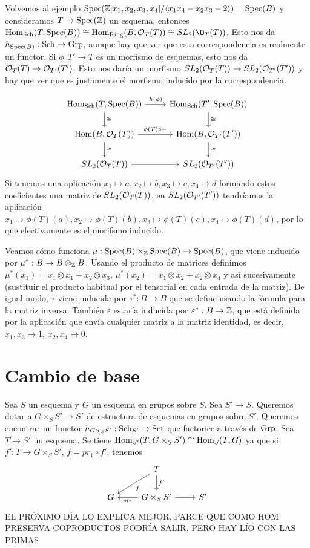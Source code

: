 \documentclass[GA.tex]{subfiles}
\begin{document}
\begin{ej}
Volvemos al ejemplo $\operatorname{Spec}(\mathbb{Z}[x_1,x_2,x_3,x_4]/\langle{x_1x_4-x_2x_3-2}\rangle)=\operatorname{Spec}(B)$ y consideramos $T\to\operatorname{Spec}(\mathbb{Z})$ un esquema, entonces $\Hom_{\Sch}(T, \spec(B))\cong \Hom_{\Ring}(B,\OO_T(T))\cong SL_2(\O_T(T))$. Esto nos da $h_{\operatorname{Spec}(B)}:\operatorname{Sch}\to\operatorname{Grp}$, aunque hay que ver que esta correspondencia es realmente un functor. Si $\phi:T'\to T$ es un morfismo de esquemas, esto nos da ${\mathcal O}_T(T)\to{\mathcal O}_{T'}(T')$. Esto nos daría un morfismo $SL_2({\mathcal O}_T(T))\to SL_2({\mathcal O}_{T'}(T'))$ y hay que ver que es justamente el morfismo inducido por la correspondencia.

\[
\begin{tikzcd}
\Hom_{\Sch}(T,\spec(B))\arrow[r, "h(\phi)"]\arrow[d, "\cong"] & \Hom_{\Sch}(T',\spec(B))\arrow[d, "\cong"]\\
\Hom(B,\OO_T(T))\arrow[r, "\phi(T)\circ-"]\arrow[d, "\cong"] & \Hom(B,\OO_{T'}(T'))\arrow[d,"\cong"]\\
SL_2(\OO_T(T))\arrow[r] & SL_2(\OO_{T'}(T'))
\end{tikzcd}
\]
Si tenemos una aplicación $x_1\mapsto a, x_2\mapsto b, x_3\mapsto c, x_4\mapsto d$ formando estos coeficientes una matriz de $SL_2({\mathcal O}_T(T))$, en $SL_2({\mathcal O}_{T'}(T'))$ tendríamos la aplicación $x_1\mapsto \phi(T)(a), x_2\mapsto\phi(T)(b),x_3\mapsto\phi(T)(c),x_4\mapsto\phi(T)(d)$, por lo que efectivamente es el morifsmo inducido. 


Veamos cómo funciona $\mu:\operatorname{Spec}(B)\times_{\mathbb{Z}}\operatorname{Spec}(B)\to\operatorname{Spec}(B)$, que viene inducido por $\mu^*:B\to B\otimes_{\mathbb{Z}} B$. Usando el producto de matrices definimos $\mu^*(x_1)=x_1\otimes x_1+x_2\otimes x_3$, $\mu^*(x_2)=x_1\otimes x_2+x_2\otimes x_4$ y así sucesivamente (sustituir el producto habitual por el tensorial en cada entrada de la matriz). De igual modo, $\tau$ viene inducida por $\tau^*:B\to B$ que se define usando la fórmula para la matriz inversa. También $\varepsilon$ estaría inducida por $\varepsilon^*:B\to \mathbb{Z}$, que está definida por la aplicación que envía cualquier matriz a la matriz identidad, es decir, $x_1,x_3\mapsto 1$, $x_2,x_4\mapsto 0$. 

\section{Cambio de base}

Sea $S$ un esquema y $G$ un esquema en grupos sobre $S$. Sea $S'\to S$. Queremos dotar a $G\times_S S'\to S'$ de estructura de esquemas en grupos sobre $S'$. Queremos encontrar un functor $h_{G\times_S S'}:\operatorname{Sch}_{S'}\to\operatorname{Set}$ que factorice a través de $\operatorname{Grp}$. Sea $T\to S'$ un esquema. Se tiene $\operatorname{Hom}_{S'}(T, G\times_S S')\cong\operatorname{Hom}_S(T,G)$ ya que si $f':T\to G\times_S S'$, $f=pr_1\circ f'$, tenemos
\[
\begin{tikzcd}
&T\arrow[dl, "f"]\arrow[d, "f'"]&\\
G& G\times_S S'\arrow[l, "pr_1"]\arrow[r]& S'
\end{tikzcd}
\]
EL PRÓXIMO DÍA LO EXPLICA MEJOR, PARCE QUE COMO HOM PRESERVA COPRODUCTOS PODRÍA SALIR, PERO HAY LÍO CON LAS PRIMAS

\end{ej}
\end{document}
